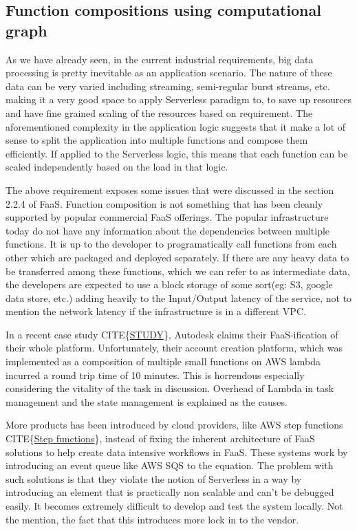 \documentclass[12pt,titlepage]{article}
\begin{document}
\subsection{Function compositions using computational graph}
\label{sec:org23270d1}

As we have already seen, in the current industrial requirements, big data
processing is pretty inevitable as an application scenario. The nature of these
data can be very varied including streaming, semi-regular burst streams, etc.
making it a very good space to apply Serverless paradigm to, to save up
resources and have fine grained scaling of the resources based on requirement.
The aforementioned complexity in the application logic suggests that it make a
lot of sense to split the application into multiple functions and compose them
efficiently. If applied to the Serverless logic, this means that each function
can be scaled independently based on the load in that logic.

The above requirement exposes some issues that were discussed in the section
2.2.4 of FaaS. Function composition is not something that has been cleanly
supported by popular commercial FaaS offerings. The popular infrastructure today
do not have any information about the dependencies between multiple functions.
It is up to the developer to programatically call functions from each other
which are packaged and deployed separately. If there are any heavy data to be
transferred among these functions, which we can refer to as intermediate
data, the developers are expected to use a block storage of some sort(eg: S3,
google data store, etc.) adding heavily to the Input/Output latency of the
service, not to mention the network latency if the infrastructure is in a
different VPC.

In a recent case study CITE\{\href{https://aws.amazon.com/solutions/case-studies/autodesk-serverless/}{STUDY}\}, Autodesk claims their FaaS-ification of
their whole platform. Unfortunately, their account creation platform, which was
implemented as a composition of multiple small functions on AWS lambda incurred
a round trip time of 10 minutes. This is horrendous especially considering the
vitality of the task in discussion. Overhead of Lambda in task management and
the state management is explained as the causes.

More products has been introduced by cloud providers, like AWS step functions
CITE\{\href{https://aws.amazon.com/step-functions/?step-functions.sort-by=item.additionalFields.postDateTime\&step-functions.sort-order=desc}{Step functions}\}, instead of fixing the inherent architecture of FaaS
solutions to help create data intensive workflows in FaaS. These systems work by
introducing an event queue like AWS SQS to the equation. The problem with such
solutions is that they violate the notion of Serverless in a way by introducing
an element that is practically non scalable and can't be debugged easily. It
becomes extremely difficult to develop and test the system locally. Not
the mention, the fact that this introduces more lock in to the vendor. 
\end{document}
